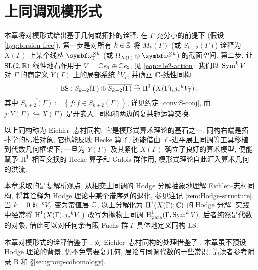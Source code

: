 
\chapter{上同调观模形式}
本章将对模形式给出基于几何或拓扑的诠释. 在 $\Gamma$ 充分小的前提下 (假设 \ref{hyp:torsion-free}), 第一步是对所有 $k \in \mathbb{Z}$ 将 $M_k(\Gamma)$ (或 $S_{k+2}(\Gamma)$) 诠释为 $X(\Gamma)$ 上某个线丛 $\bomega_\Gamma^{\otimes k}$ (或 $\Omega_{X(\Gamma)} \otimes \bomega_\Gamma^{\otimes k}$) 的截面空间. 第二步, 让 $\operatorname{SL}(2,\mathbb{R})$ 线性地右作用于 $V = \mathbb{C} e_1 \oplus \mathbb{C} e_2$, 见 \eqref{eqn:e1e2-action}; 我们以 $\operatorname{Sym}^k V$ 对 $\Gamma$ 的商定义 $Y(\Gamma)$ 上的局部系统 ${}^k V_\Gamma$, 并确立 $\mathbb{C}$-线性同构
\begin{equation*}
	\mathrm{ES}: S_{k+2}(\Gamma) \oplus \overline{S_{k+2}(\Gamma)} \stackrel{\sim}{\rightarrow} \operatorname{H}^1\left( X(\Gamma), j_* {}^k V_\Gamma \right),
\end{equation*}
其中 $\overline{S_{k+2}(\Gamma)} := \left\{\overline{f}: f \in S_{k+2}(\Gamma) \right\}$, 详见约定 \ref{conv:S-conj}, 而 $j: Y(\Gamma) \hookrightarrow X(\Gamma)$ 是开嵌入. 同构和两边的复共轭运算交换.

以上同构称为 Eichler--志村同构, 它是模形式算术理论的基石之一. 同构右端是拓扑学的标准对象, 它也能反映 Hecke 算子, 还能借由 $\ell$-进平展上同调等工具移植到代数几何框架下; 一旦为 $Y(\Gamma)$ 及其紧化 $X(\Gamma)$ 确立了良好的算术模型, 便能赋予 $\operatorname{H}^1$ 相互交换的 Hecke 算子和 Galois 群作用, 模形式理论自此汇入算术几何的洪流.

本章采取的是复解析观点, 从相交上同调的 Hodge 分解抽象地理解 Eichler--志村同构, 将其诠释为 Hodge 理论中某个谱序列的退化, 参见注记 \ref{rem:Hodge-structure}. 当 $k=0$ 时 ${}^k V_\Gamma$ 变为常值层 $\mathbb{C}$, 以上分解化为 $\operatorname{H}^1(X(\Gamma); \mathbb{C})$ 的 Hodge 分解. 实践中经常将 $\operatorname{H}^1(X(\Gamma), j_* {}^k V_\Gamma)$ 改写为抛物上同调 $\operatorname{H}^1_{\mathrm{para}}(\Gamma, \operatorname{Sym}^k V)$, 后者纯然是代数的对象, 借此可以对任何余有限 Fuchs 群 $\Gamma$ 具体地定义同构 $\mathrm{ES}$.

本章对模形式的诠释借鉴于 \cite{Del71}. 对 Eichler--志村同构的处理借鉴了 \cite{BN81}. 本章虽不预设 Hodge 理论的背景, 仍不免需要复几何, 层论与同调代数的一些常识, 请读者参考附录 B 和 \S\ref{sec:group-cohomology}.

